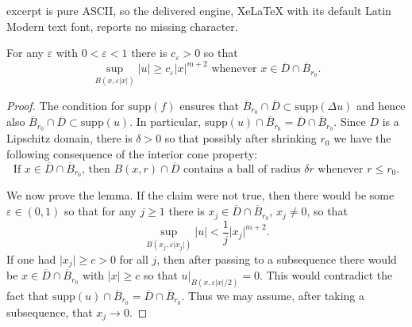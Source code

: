 \documentclass[10pt,a4paper]{amsart}
\newcommand{\abs}[1]{\lvert #1 \rvert}          %
\newcommand{\eps}{\varepsilon}
\newcommand{\ol}[1]{\overline{#1}}
\newcommand{\supp}{\mathrm{supp}}
\begin{document}
excerpt is pure ASCII, so the delivered engine, XeLaTeX with its default Latin Modern text font, reports no missing character.
\begin{Lemma} \label{lemma_nondegeneracy}
For any $\eps$ with $0 < \eps < 1$ there is $c_{\eps} > 0$ so that 
\[
\sup_{B(x, \eps \abs{x})} \abs{u} \geq c_{\eps} \abs{x}^{m+2} \text{ whenever $x \in \ol{D} \cap \ol{B}_{r_0}$}.
\]
\end{Lemma}

\begin{proof}

The condition for $\supp(f)$ ensures that $\ol{B}_{r_0} \cap \ol{D} \subset \supp(\Delta u)$ and hence also $\ol{B}_{r_0} \cap \ol{D} \subset \supp(u)$. In particular, $\supp(u) \cap \ol{B}_{r_0} = \ol{D} \cap \ol{B}_{r_0}$. Since $D$ is a Lipschitz domain, there is $\delta > 0$ so that possibly after shrinking $r_0$ we have the following consequence of the interior cone property:
\begin{equation} \label{interior_ball}
\text{If $x \in \ol{D} \cap \ol{B}_{r_0}$, then $B(x, r) \cap \ol{D}$ contains a ball of radius $\delta r$ whenever $r \leq r_0$.}
\end{equation}

We now prove the lemma. If the claim were not true, then there would be some $\eps \in (0,1)$ so that for any $j \geq 1$ there is $x_j \in \ol{D} \cap \ol{B}_{r_0}$, $x_j \neq 0$, so that 
\begin{equation} \label{nondegeneracy_contradiction}
\sup_{B(x_j, \eps \abs{x_j})} \abs{u} < \frac{1}{j} \abs{x_j}^{m+2}.
\end{equation}
If one had $\abs{x_j} \geq c > 0$ for all $j$, then after passing to a subsequence there would be $x \in \ol{D} \cap \ol{B}_{r_0}$ with $\abs{x} \geq c$ so that $u|_{B(x, \eps\abs{x}/2)} = 0$. This would contradict the fact that $\supp(u) \cap \ol{B}_{r_0} = \ol{D} \cap \ol{B}_{r_0}$. Thus we may assume, after taking a subsequence, that $x_j \to 0$.


\end{proof}
\end{document}

